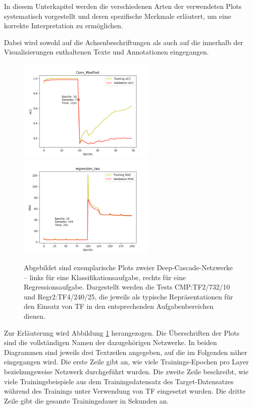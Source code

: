 In diesem Unterkapitel werden die verschiedenen Arten der verwendeten Plots systematisch vorgestellt und deren spezifische Merkmale erläutert, 
um eine korrekte Interpretation zu ermöglichen.

Dabei wird sowohl auf die Achsenbeschriftungen als auch auf die innerhalb der Visualisierungen enthaltenen Texte und Annotationen eingegangen.

\begin{figure}[htpb]
    \includegraphics[height=5cm]{../../Plots/ba_plots/convmaxpool/2TFtr.png}
    \includegraphics[height=5cm]{../../Plots/ba_plots/regr2/regr2train.png}
    \caption{\label{fig:ploterkl} 
    \small{Abgebildet sind exemplarische Plots zweier Deep-Cascade-Netzwerke – links für eine Klassifikationsaufgabe, rechts für eine 
    Regressionsaufgabe.
    Dargestellt werden die Tests CMP:TF2/732/10 und Regr2:TF4/240/25, die jeweils als typische Repräsentationen für den Einsatz von TF 
    in den entsprechenden Aufgabenbereichen dienen.}}
\end{figure}

Zur Erläuterung wird Abbildung \ref{fig:ploterkl} herangezogen. Die Überschriften der Plots sind die vollständigen Namen der dazugehörigen 
Netzwerke. In beiden Diagrammen sind jeweils drei Textzeilen angegeben, auf die im 
Folgenden näher eingegangen wird. Die erste Zeile gibt an, wie viele Trainings-Epochen pro Layer beziehungsweise Netzwerk durchgeführt wurden. 
Die zweite Zeile beschreibt, wie viele Trainingsbeispiele aus dem Trainingsdatensatz des Target-Datensatzes während des Trainings unter 
Verwendung von TF eingesetzt wurden. Die dritte Zeile gibt die gesamte Trainingsdauer in Sekunden an.

